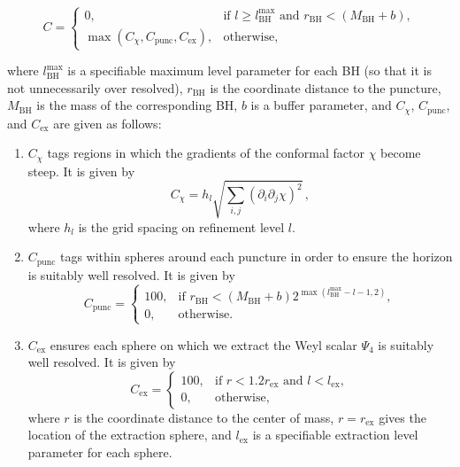 \begin{equation}
    C=
    \begin{cases}
        0, &\text{if }l\geq l_{\mathrm{BH}}^{\max}
        \text{ and } r_{\mathrm{BH}} < (M_{\mathrm{BH}}+b),\\
        \max(C_{\chi},C_{\mathrm{punc}},C_{\mathrm{ex}}),&
        \text{otherwise},
    \end{cases}
\end{equation}

where $l_{\mathrm{BH}}^{\max}$ is a specifiable maximum level parameter
for each BH (so that it is not unnecessarily over resolved),
$r_{\mathrm{BH}}$ is the coordinate distance to the puncture,
$M_{\mathrm{BH}}$ is the mass of the corresponding BH, $b$ is a buffer
parameter, and $C_\chi$, $C_{\mathrm{punc}}$, and $C_{\mathrm{ex}}$ are
given as follows:
\begin{enumerate}
    \item
        $C_{\chi}$ tags regions in which the gradients of the conformal
        factor $\chi$ become steep. It is given by
        \begin{equation}
            C_{\chi} = h_l\sqrt{\sum_{i,j}\left(
            \partial_i\partial_j\chi\right)^2}\,,
        \end{equation}
        where $h_l$ is the grid spacing on refinement level $l$.
    \item
        $C_{\mathrm{punc}}$ tags within spheres around each puncture in
        order to ensure the horizon is suitably well resolved. It is given
        by
        \begin{equation}
            C_{\mathrm{punc}} =
            \begin{cases}
                100, &\text{if } r_{\mathrm{BH}} <
                (M_{\mathrm{BH}}+b) 2^{\max(l_\mathrm{BH}^{\max}-l-1, 2)}, \\
                0, & \text{otherwise}.
            \end{cases}
        \end{equation}
    \item
        $C_{\mathrm{ex}}$ ensures each sphere on which we extract the
        Weyl scalar $\Psi_4$ is suitably well resolved. It is given by
        \begin{equation}
            C_{\mathrm{ex}} =
            \begin{cases}
                100, &\text{if } r < 1.2r_{\mathrm{ex}} \text{ and }
                l < l_{\mathrm{ex}}, \\
                0, & \text{otherwise},
            \end{cases}
        \end{equation}
         where $r$ is the coordinate distance to the center of mass,
         $r=r_{\mathrm{ex}}$ gives the location of the extraction sphere,
         and $l_{\mathrm{ex}}$ is a specifiable extraction level parameter
         for each sphere.
\end{enumerate}
